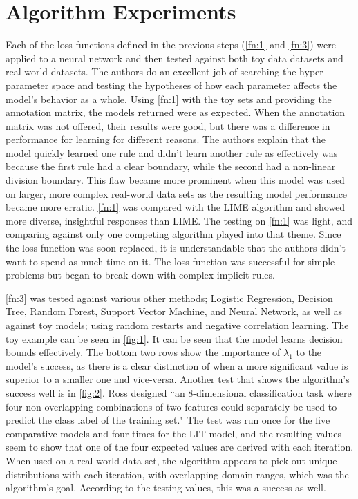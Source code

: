 \documentclass[twoside,11pt]{article}
\begin{document}
\section{Algorithm Experiments}
\label{sec:alg exp}
Each of the loss functions defined in the previous steps (\cref{fn:1} and \cref{fn:3}) were applied to a neural network and then tested against both toy data datasets and real-world datasets. The authors do an excellent job of searching the hyper-parameter space and testing the hypotheses of how each parameter affects the model's behavior as a whole. Using \cref{fn:1} with the toy sets and providing the annotation matrix, the models returned were as expected. When the annotation matrix was not offered, their results were good, but there was a difference in performance for learning for different reasons. The authors explain that the model quickly learned one rule and didn't learn another rule as effectively was because the first rule had a clear boundary, while the second had a non-linear division boundary. This flaw became more prominent when this model was used on larger, more complex real-world data sets as the resulting model performance became more erratic. \cref{fn:1} was compared with the LIME algorithm and showed more diverse, insightful responses than LIME. The testing on \cref{fn:1} was light, and comparing against only one competing algorithm played into that theme. Since the loss function was soon replaced, it is understandable that the authors didn't want to spend as much time on it. The loss function was successful for simple problems but began to break down with complex implicit rules. 

\cref{fn:3} was tested against various other methods; Logistic Regression, Decision Tree, Random Forest, Support Vector Machine, and Neural Network, as well as against toy models; using random restarts and negative correlation learning. The toy example can be seen in \cref{fig:1}. It can be seen that the model learns decision bounds effectively. The bottom two rows show the importance of $\lambda_1$ to the model's success, as there is a clear distinction of when a more significant value is superior to a smaller one and vice-versa. Another test that shows the algorithm's success well is in \cref{fig:2}. Ross designed ``an 8-dimensional classification task where four non-overlapping combinations of two features could separately be used to predict the class label of the training set." The test was run once for the five comparative models and four times for the LIT model, and the resulting values seem to show that one of the four expected values are derived with each iteration. When used on a real-world data set, the algorithm appears to pick out unique distributions with each iteration, with overlapping domain ranges, which was the algorithm's goal. According to the testing values, this was a success as well. 
\end{document}
